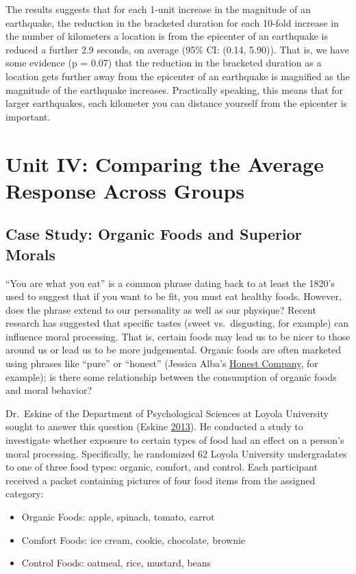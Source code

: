 \documentclass[]{book}
\providecommand{\tightlist}{%
  \setlength{\itemsep}{0pt}\setlength{\parskip}{0pt}}
\theoremstyle{plain}
\theoremstyle{mydefn}
\theoremstyle{myexmpl}
\theoremstyle{remark}
\begin{document}
The results suggests that for each 1-unit increase in the magnitude of
an earthquake, the reduction in the bracketed duration for each 10-fold
increase in the number of kilometers a location is from the epicenter of
an earthquake is reduced a further 2.9 seconds, on average (95\% CI:
(0.14, 5.90)). That is, we have some evidence (p = 0.07) that the
reduction in the bracketed duration as a location gets further away from
the epicenter of an earthquake is magnified as the magnitude of the
earthquake increases. Practically speaking, this means that for larger
earthquakes, each kilometer you can distance yourself from the epicenter
is important.

\part{Unit IV: Comparing the Average Response Across
Groups}\label{part-unit-iv-comparing-the-average-response-across-groups}

\hypertarget{CaseOrganic}{\chapter{Case Study: Organic Foods and
Superior Morals}\label{CaseOrganic}}

``You are what you eat'' is a common phrase dating back to at least the
1820's used to suggest that if you want to be fit, you must eat healthy
foods. However, does the phrase extend to our personality as well as our
physique? Recent research has suggested that specific tastes (sweet
vs.~disgusting, for example) can influence moral processing. That is,
certain foods may lead us to be nicer to those around us or lead us to
be more judgemental. Organic foods are often marketed using phrases like
``pure'' or ``honest'' (Jessica Alba's
\href{https://www.honest.com/}{Honest Company}, for example); is there
some relationship between the consumption of organic foods and moral
behavior?

Dr.~Eskine of the Department of Psychological Sciences at Loyola
University sought to answer this question (Eskine
\protect\hyperlink{ref-Eskine2013}{2013}). He conducted a study to
investigate whether exposure to certain types of food had an effect on a
person's moral processing. Specifically, he randomized 62 Loyola
University undergradates to one of three food types: organic, comfort,
and control. Each participant received a packet containing pictures of
four food items from the assigned category:

\begin{itemize}
\tightlist
\item
  Organic Foods: apple, spinach, tomato, carrot
\item
  Comfort Foods: ice cream, cookie, chocolate, brownie
\item
  Control Foods: oatmeal, rice, mustard, beans
\end{itemize}
\end{document}
